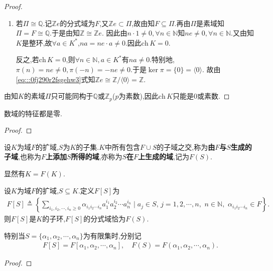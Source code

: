 \documentclass[../../main.tex]{subfiles}%
\begin{document}
\begin{proof}
\begin{enumerate}[(1)]
\item 若$\Pi \cong \mathbb{Q}$.记$\mathbb{Z}e$的分式域为$F$,又$\mathbb{Z}e\subset \Pi$,故由知$F\subseteq \Pi$.再由$\Pi$是素域知$\Pi=F\cong \mathbb{Q}$.于是由知$\mathbb{Z}\cong\mathbb{Z}e$.
因此由$n\cdot 1\neq 0,\forall n\in \mathbb{N}$知$ne\neq0,\forall n\in\mathbb{N}$.又由知$K$是整环,故$\forall a\in K^*$,$na=ne\cdot a\neq0$.因此$\mathrm{ch}\,K=0$.

反之,若$\mathrm{ch}\,K=0$,则$\forall n\in\mathbb{N},a\in K^*$有$na\neq0$.特别地,$\pi(n)=ne\neq0,\pi(-n)=-ne\neq 0$.于是$\ker \pi =\{0\}=\langle0\rangle$.
故由\eqref{eq:::0fj290r2fsgehw3}式知$\mathbb{Z}e\cong\mathbb{Z}/\langle0\rangle=\mathbb{Z}$.
\end{enumerate}
由知$K$的素域$\Pi$只可能同构于$\mathbb{Q}$或$\mathbb{Z}_p$($p$为素数),因此$\mathrm{ch}\,K$只能是$0$或素数.
\end{proof}

\begin{corollary}\label{corollary:数域的特征都是零}
数域的特征都是零.
\end{corollary}
\begin{proof}

\end{proof}

\begin{definition}
设$K$为域$F$的扩域,$S$为$K$的子集.$K$中所有包含$F\cup S$的子域之交,称为\textbf{由$F$与$S$生成的子域},也称为\textbf{$F$上添加$S$所得的域},亦称为\textbf{$S$在$F$上生成的域},记为$F(S)$.
\end{definition}
\begin{remark}
显然有$K=F(K)$.
\end{remark}

\begin{theorem}\label{theorem:F上添加S生成的域就是FS的分式域}
设$K$为域$F$的扩域,$S\subseteq K$.定义$F[S]$为
\begin{align*}
F[S]\triangleq \left\{ \sum_{i_1,i_2,\cdots ,i_n\geqslant 0}{\alpha _{i_1i_2\cdots i_n}a_{1}^{i_1}a_{2}^{i_2}}\cdots a_{n}^{i_n}\mid a_j\in S,\,j=1,2,\cdots ,n,\,\,n\in \mathbb{N},\,\,\alpha _{i_1i_2\cdots i_n}\in F \right\}.
\end{align*}
则$F[S]$是$K$的子环,$F[S]$的分式域恰为$F(S)$.

特别当$S=\{\alpha_1,\alpha_2,\cdots,\alpha_n\}$为有限集时,分别记
\begin{align*}
F[S]=F[\alpha_1,\alpha_2,\cdots,\alpha_n],\quad F(S)=F(\alpha_1,\alpha_2,\cdots,\alpha_n).
\end{align*}
\end{theorem}
\begin{proof}

\end{proof}
\end{document}

